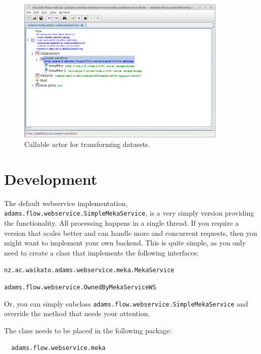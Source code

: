 \documentclass[a4paper]{book}
\begin{document}
\begin{figure}[htb]
  \centering
  \includegraphics[width=10.0cm]{images/transform_callable_actor.png}
  \caption{Callable actor for transforming datasets.}
  \label{transform_callable_actor}
\end{figure}

\chapter{Development}
The default webservice implementation, \texttt{adams.flow.webservice.SimpleMekaService},
is a very simply version providing the functionality. All processing happens
in a single thread. If you require a version that scales better and can handle
more and concurrent requests, then you might want to implement your own
backend. This is quite simple, as you only need to create a class that implements
the following interfaces:
\begin{tight_itemize}
	\item \texttt{nz.ac.waikato.adams.webservice.meka.MekaService}
	\item \texttt{adams.flow.webservice.OwnedByMekaServiceWS}
\end{tight_itemize}
Or, you can simply subclass \texttt{adams.flow.webservice.SimpleMekaService}
and override the method that needs your attention.

The class needs to be placed in the following package:
\begin{verbatim}
  adams.flow.webservice.meka
\end{verbatim}


\end{document}
